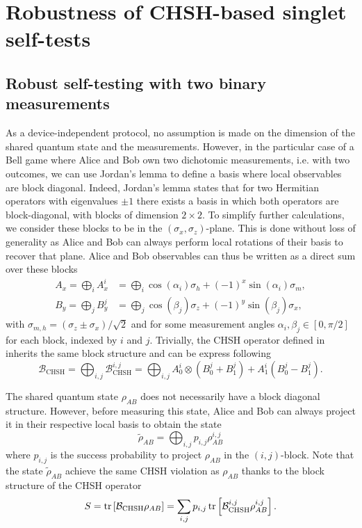 \section{Robustness of CHSH-based singlet self-tests}

\subsection{Robust self-testing with two binary measurements}

As a device-independent protocol, no assumption is made on the dimension of the shared quantum state and the measurements.
However, in the particular case of a Bell game where Alice and Bob own two dichotomic measurements, i.e. with two outcomes, we can use Jordan's lemma to define a basis where local observables are block diagonal.
Indeed, Jordan's lemma states that for two Hermitian operators with eigenvalues $\pm1$ there exists a basis in which both operators are block-diagonal, with blocks of dimension $2 \times 2$.
To simplify further calculations, we consider these blocks to be in the $(\sigma_x,\sigma_z)$-plane.
This is done without loss of generality as Alice and Bob can always perform local rotations of their basis to recover that plane.
Alice and Bob observables can thus be written as a direct sum over these blocks 
\begin{equation}
	\begin{split}
	A_x = \bigoplus_i A_x^i &= \bigoplus_i \cos(\alpha_i)\sigma_h + (-1)^x \sin(\alpha_i)\sigma_m, \\
	B_y = \bigoplus_j B_y^j &= \bigoplus_j \cos(\beta_j)\sigma_z + (-1)^y \sin(\beta_j)\sigma_x,
	\end{split}
	\label{eq:block_observables}
\end{equation}
with $\sigma_{m,h} = (\sigma_z \pm \sigma_x)/\sqrt{2}$ and for some measurement angles $\alpha_i,\beta_j\in[0,\pi/2]$ for each block, indexed by $i$ and $j$.
Trivially, the CHSH operator defined in  inherits the same block structure and can be express following
\begin{equation}
	\mathcal{B}_\text{CHSH} = \bigoplus_{i,j} \mathcal{B}_\text{CHSH}^{i,j} = \bigoplus_{i,j} A_0^i \otimes (B_0^j + B_1^j) + A_1^i (B_0^j - B_1^j).
	\label{eq:block_operator}
\end{equation}

The shared quantum state $\rho_{AB}$ does not necessarily have a block diagonal structure. 
However, before measuring this state, Alice and Bob can always project it in their respective local basis to obtain the state
\begin{equation}
	\tilde{\rho}_{AB} = \bigoplus_{i,j} p_{i,j}\rho_{AB}^{i,j}
	\label{eq:}
\end{equation}
where $p_{i,j}$ is the success probability to project $\rho_{AB}$ in the $(i,j)$-block.
Note that the state $\tilde{\rho}_{AB}$ achieve the same CHSH violation as $\rho_{AB}$ thanks to the block structure of the CHSH operator
\begin{equation}
	S = \trr{\mathcal{B}_\text{CHSH}\rho_{AB}} = \sum_{i,j} p_{i,j} \trr{\mathcal{B}_\text{CHSH}^{i,j}\rho_{AB}^{i,j}}.
	\label{eq:}
\end{equation}

